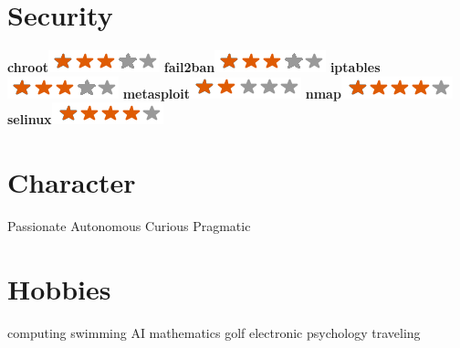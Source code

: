 \documentclass[]{friggeri-cv}
\begin{document}
\begin{aside}
    \section{Security}
        \textbf{chroot}\includegraphics[scale=0.40]{img/3stars.png}
        \textbf{fail2ban}\includegraphics[scale=0.40]{img/3stars.png}
        \textbf{iptables}\includegraphics[scale=0.40]{img/3stars.png}
        \textbf{metasploit}\includegraphics[scale=0.40]{img/2stars.png}
        \textbf{nmap}\includegraphics[scale=0.40]{img/4stars.png}
        \textbf{selinux}\includegraphics[scale=0.40]{img/4stars.png}
        ~
    \section{Character}
        Passionate
        Autonomous
        Curious
        Pragmatic
        ~
    \section{Hobbies}
        computing
	swimming
	AI
	mathematics
	golf
        electronic
        psychology
        traveling
\end{aside}
\end{document}
